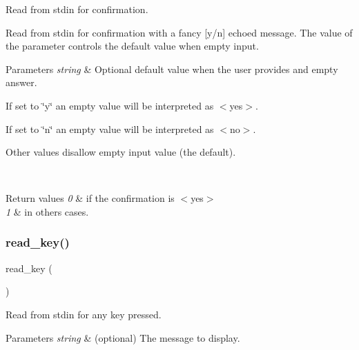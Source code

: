 Read from stdin for confirmation. 

Read from stdin for confirmation with a fancy \mbox{[}y/n\mbox{]} echoed message. The value of the parameter controls the default value when empty input. 
\begin{DoxyParams}{Parameters}
{\em string} & Optional default value when the user provides and empty answer.
\begin{DoxyItemize}
\item If set to \char`\"{}y\char`\"{} an empty value will be interpreted as $<$yes$>$.
\item If set to \char`\"{}n\char`\"{} an empty value will be interpreted as $<$no$>$.
\item Other values disallow empty input value (the default). 
\end{DoxyItemize}\\
\hline
\end{DoxyParams}

\begin{DoxyRetVals}{Return values}
{\em 0} & if the confirmation is $<$yes$>$ \\
\hline
{\em 1} & in others cases. \\
\hline
\end{DoxyRetVals}
\mbox{\label{group__stdin_ga13f97ec87f85badbce75a410d1ee9d03}} 
\subsubsection{\texorpdfstring{read\+\_\+key()}{read\_key()}}
{\footnotesize\ttfamily read\+\_\+key (\begin{DoxyParamCaption}\item[{string}]{ }\end{DoxyParamCaption})}



Read from stdin for any key pressed. 


\begin{DoxyParams}{Parameters}
{\em string} & (optional) The message to display. \\
\hline
\end{DoxyParams}
\mbox{\label{group__stdin_ga48cdd2c9387240df93e79364425097f3}} 
